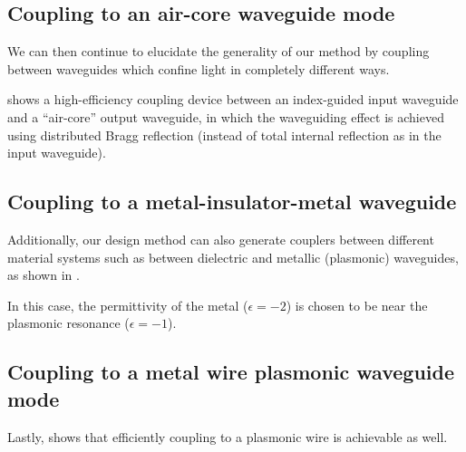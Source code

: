 \subsection{Coupling to an air-core waveguide mode}
We can then continue to elucidate the generality of our method
    by coupling between waveguides which confine light 
    in completely different ways.

 shows  a high-efficiency coupling device between 
    an index-guided input waveguide and
    a ``air-core'' output waveguide, 
    in which the waveguiding effect is achieved using distributed Bragg reflection
    (instead of total internal reflection as in the input waveguide).

\subsection{Coupling to a metal-insulator-metal waveguide }
Additionally, our design method can also generate couplers
    between different material systems such as 
    between dielectric and metallic (plasmonic) waveguides,
    as shown in .

In this case, the permittivity of the metal ($\epsilon = -2$) is chosen to be 
    near the plasmonic resonance ($\epsilon = -1$).

\subsection{Coupling to a metal wire plasmonic waveguide mode}
Lastly,  shows that efficiently coupling to a plasmonic wire
    is achievable as well.


